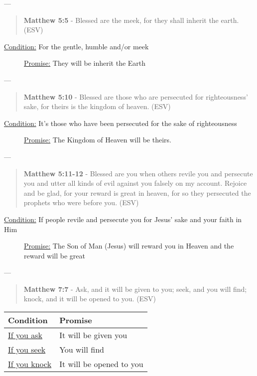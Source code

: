 \documentclass[11pt]{article}
\begin{document}
---

\begin{quote}
\textbf{Matthew 5:5} - Blessed are the meek, for they shall inherit the earth. (ESV)
\end{quote}

\begin{description}
\item[{\uline{Condition:} For the gentle, humble and/or meek}] \uline{Promise:} They will be inherit the Earth
\end{description}

---

\begin{quote}
\textbf{Matthew 5:10} - Blessed are those who are persecuted for righteousness' sake, for theirs is the kingdom of heaven. (ESV)
\end{quote}

\begin{description}
\item[{\uline{Condition:} It's those who have been persecuted for the sake of righteousness}] \uline{Promise:} The Kingdom of Heaven will be theirs.
\end{description}

---

\begin{quote}
\textbf{Matthew 5:11-12} - Blessed are you when others revile you and persecute you and utter all kinds of evil against you falsely on my account. Rejoice and be glad, for your reward is great in heaven, for so they persecuted the prophets who were before you. (ESV)
\end{quote}

\begin{description}
\item[{\uline{Condition:} If people revile and persecute you for Jesus' sake and your faith in Him}] \uline{Promise:} The Son of Man (Jesus) will reward you in Heaven and the reward will be great
\end{description}

---

\begin{quote}
\textbf{Matthew 7:7} - Ask, and it will be given to you; seek, and you will find; knock, and it will be opened to you. (ESV)
\end{quote}

\begin{center}
\begin{tabular}{ll}
Condition & Promise\\[0pt]
\hline
\uline{If you ask} & It will be given you\\[0pt]
\uline{If you seek} & You will find\\[0pt]
\uline{If you knock} & It will be opened to you\\[0pt]
\end{tabular}
\end{center}
\end{document}
